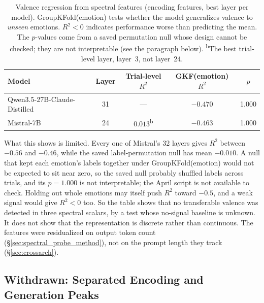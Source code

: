 \documentclass[11pt,a4paper]{article}
\begin{document}
\begin{table}[H]
\centering
\caption{Valence regression from spectral features (encoding features, best layer per model). GroupKFold(emotion) tests whether the model generalizes valence to \emph{unseen} emotions. $R^2 < 0$ indicates performance worse than predicting the mean. The $p$-values come from a saved permutation null whose design cannot be checked; they are not interpretable (see the paragraph below). \textsuperscript{b}The best trial-level layer, layer~3, not layer~24.}
\label{tab:regression}
\begin{tabular}{lcccc}
\toprule
\textbf{Model} & \textbf{Layer} & \textbf{Trial-level $R^2$} & \textbf{GKF(emotion) $R^2$} & \textbf{$p$} \\
\midrule
Qwen3.5-27B-Claude-Distilled & 31 & --- & $-0.470$ & 1.000 \\
Mistral-7B & 24 & $0.013$\textsuperscript{b} & $-0.463$ & 1.000 \\
\bottomrule
\end{tabular}
\end{table}

What this shows is limited. Every one of Mistral's 32 layers gives $R^2$ between $-0.56$ and $-0.46$, while the saved label-permutation null has mean $-0.010$. A null that kept each emotion's labels together under GroupKFold(emotion) would not be expected to sit near zero, so the saved null probably shuffled labels across trials, and its $p = 1.000$ is not interpretable; the April script is not available to check. Holding out whole emotions may itself push $R^2$ toward $-0.5$, and a weak signal would give $R^2 < 0$ too. So the table shows that no transferable valence was detected in three spectral scalars, by a test whose no-signal baseline is unknown. It does not show that the representation is discrete rather than continuous. The features were residualized on output token count (\S\ref{sec:spectral_probe_method}), not on the prompt length they track (\S\ref{sec:crossarch}).

\subsection{Withdrawn: Separated Encoding and Generation Peaks}
\label{sec:separation}
\end{document}
